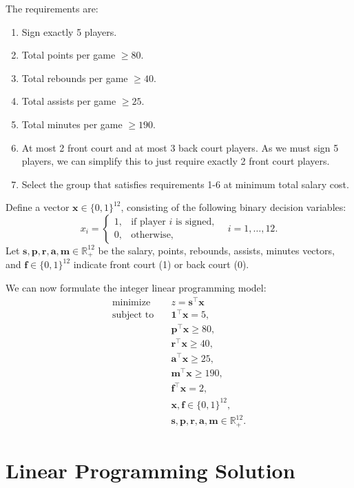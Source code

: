 \documentclass[a4paper,11pt]{article}
\begin{document}
\vspace{-0.5em}
The requirements are:
\begin{enumerate}
  \item Sign exactly 5 players.
  \item Total points per game $\ge80$.
  \item Total rebounds per game $\ge40$.
  \item Total assists per game $\ge25$.
  \item Total minutes per game $\ge190$.
  \item At most 2 front court and at most 3 back court players. As we must sign 5 players, we can simplify this to just require exactly 2 front court players.
  \item Select the group that satisfies requirements 1-6 at minimum total salary cost.
\end{enumerate}

Define a vector $\bm{x} \in \{0, 1\}^{12}$, consisting of the following binary decision variables:
$$x_i=\begin{cases}1,&\text{if player }i\text{ is signed,}\\0,&\text{otherwise,}\end{cases}\quad i=1,\dots,12.$$ 
Let
$\bm{s},\bm{p},\bm{r},\bm{a},\bm{m}\in\mathbb{R}_{+}^{12}$ be the salary, points, rebounds, assists, minutes vectors, and
$\bm{f}\in\{0,1\}^{12}$ indicate front court (1) or back court (0).

\vspace{1em}
We can now formulate the integer linear programming model:
\[
\begin{aligned}
\text{minimize} \quad & z=\bm{s}^\top\bm{x}\\
\text{subject to}\quad
&\bm{1}^\top\bm{x}=5,\\
&\bm{p}^\top\bm{x}\ge80,\\
&\bm{r}^\top\bm{x}\ge40,\\
&\bm{a}^\top\bm{x}\ge25,\\
&\bm{m}^\top\bm{x}\ge190,\\
&\bm{f}^\top\bm{x}=2, \\
&\bm{x}, \bm{f} \in \{0,1\}^{12}, \\
&\bm{s}, \bm{p}, \bm{r}, \bm{a}, \bm{m} \in \mathbb{R}_+^{12}.
\end{aligned}
\]

\section{Linear Programming Solution}
\end{document}
